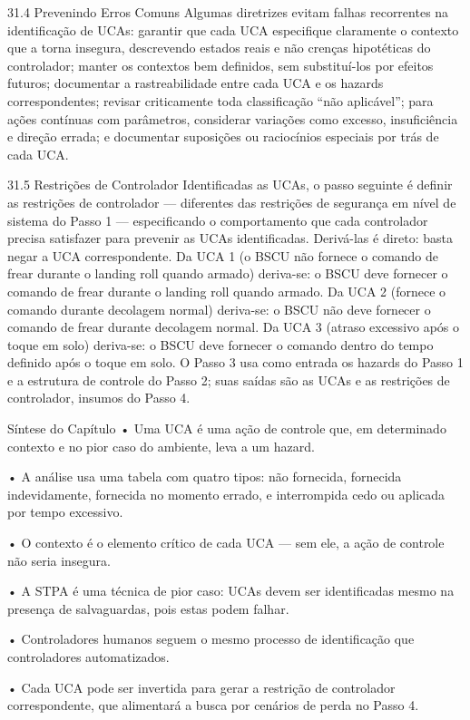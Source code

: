 31.4 Prevenindo Erros Comuns Algumas diretrizes evitam falhas recorrentes na identificação de UCAs: garantir que cada UCA especifique claramente o contexto que a torna insegura, descrevendo estados reais e não crenças hipotéticas do controlador; manter os contextos bem definidos, sem substituí-los por efeitos futuros; documentar a rastreabilidade entre cada UCA e os hazards correspondentes; revisar criticamente toda classificação “não aplicável”; para ações contínuas com parâmetros, considerar variações como excesso, insuficiência e direção errada; e documentar suposições ou raciocínios especiais por trás de cada UCA.

31.5 Restrições de Controlador Identificadas as UCAs, o passo seguinte é definir as restrições de controlador — diferentes das restrições de segurança em nível de sistema do Passo 1 — especificando o comportamento que cada controlador precisa satisfazer para prevenir as UCAs identificadas. Derivá-las é direto: basta negar a UCA correspondente. Da UCA 1 (o BSCU não fornece o comando de frear durante o landing roll quando armado) deriva-se: o BSCU deve fornecer o comando de frear durante o landing roll quando armado. Da UCA 2 (fornece o comando durante decolagem normal) deriva-se: o BSCU não deve fornecer o comando de frear durante decolagem normal. Da UCA 3 (atraso excessivo após o toque em solo) deriva-se: o BSCU deve fornecer o comando dentro do tempo definido após o toque em solo. O Passo 3 usa como entrada os hazards do Passo 1 e a estrutura de controle do Passo 2; suas saídas são as UCAs e as restrições de controlador, insumos do Passo 4.

Síntese do Capítulo • Uma UCA é uma ação de controle que, em determinado contexto e no pior caso do ambiente, leva a um hazard.

• A análise usa uma tabela com quatro tipos: não fornecida, fornecida indevidamente, fornecida no momento errado, e interrompida cedo ou aplicada por tempo excessivo.

• O contexto é o elemento crítico de cada UCA — sem ele, a ação de controle não seria insegura.

• A STPA é uma técnica de pior caso: UCAs devem ser identificadas mesmo na presença de salvaguardas, pois estas podem falhar.

• Controladores humanos seguem o mesmo processo de identificação que controladores automatizados.

• Cada UCA pode ser invertida para gerar a restrição de controlador correspondente, que alimentará a busca por cenários de perda no Passo 4.

